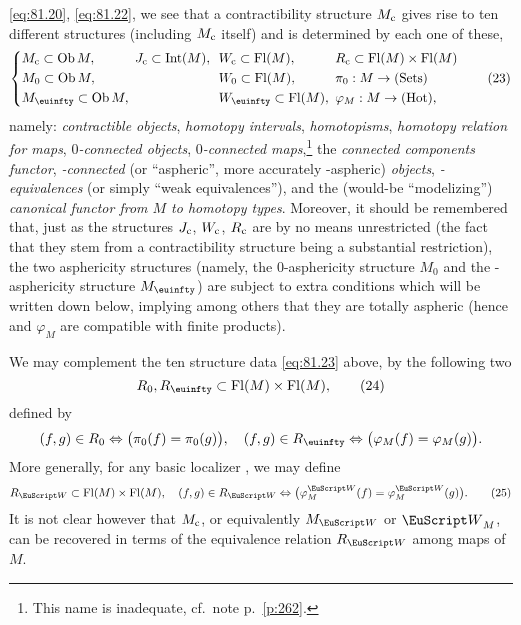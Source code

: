 \eqref{eq:81.20}, \eqref{eq:81.22}, we see that a contractibility
structure $M_{\mathrm{c}}$ gives rise to ten different structures (including
$M_{\mathrm{c}}$ itself) and is determined by each one of these,
\begin{equation}
  \label{eq:81.23}
  \left\{\begin{aligned}
    &M\subc\subset\Ob M, &&J\subc\subset\Int(M), \!\!
    &&W\subc\subset\Fl(M), &&R\subc\subset\Fl(M)\times\Fl(M) \\
    &M_0\subset\Ob M,    &&
    &&W_0\subset\Fl(M),    &&\piz:M\to\Sets \\
    &M_\oo\subset\Ob M,\!\!\!  &&
    &&W_\oo\subset\Fl(M),\!\!\!  &&\varphi_M:M\to\Hot,
  \end{aligned}\right.\tag{23}
\end{equation}
namely: \emph{contractible objects}, \emph{homotopy intervals},
\emph{homotopisms}, \emph{homotopy relation for maps},
\emph{$0$-connected objects}, \emph{$0$-connected maps},\footnote{This
  name is inadequate, cf.\ note p.\ \ref{p:262}.} the \emph{connected
  components functor}, \emph{\oo-connected} (or ``aspheric'', more
accurately \scrWoo-aspheric) \emph{objects},
\emph{\scrWoo-equivalences} (or simply ``weak equivalences''), and the
(would-be ``modelizing'') \emph{canonical functor from $M$ to homotopy
  types}. Moreover, it should be remembered that, just as the
structures $J_{\mathrm{c}}$, $W_{\mathrm{c}}$, $R_{\mathrm{c}}$ are by no means unrestricted
(the fact that they stem from a contractibility structure being a
substantial restriction), the two asphericity structures (namely, the
$0$-asphericity structure $M_0$ and the \oo-asphericity structure
$M_\oo$) are subject to extra conditions which will be written down
below, implying among others that they are totally aspheric (hence
\piz{} and $\varphi_M$ are compatible with finite products).

We may complement the ten structure data \eqref{eq:81.23} above, by
the following two
\begin{equation}
  \label{eq:81.24}
  R_0, R_\oo \subset \Fl(M)\times\Fl(M),\tag{24}
\end{equation}
defined by
\[(f,g)\in R_0 \Leftrightarrow \bigl(\piz(f)=\piz(g)\bigr), \quad
(f,g)\in R_\oo \Leftrightarrow
\bigl(\varphi_M(f)=\varphi_M(g)\bigr).\]
More generally, for any basic localizer \scrW, we may define
\begin{equation}
  \label{eq:81.25}
  R_\scrW\subset\Fl(M)\times\Fl(M),\quad
  (f,g)\in R_\scrW \Leftrightarrow
  \bigl(\varphi_M^\scrW(f)=\varphi_M^\scrW(g)\bigr).
  \tag{25}
\end{equation}
It is not clear however that $M_{\mathrm{c}}$, or equivalently $M_\scrW$ or
$\scrW_M$, can be recovered in terms of the equivalence relation
$R_\scrW$ among maps of $M$.

